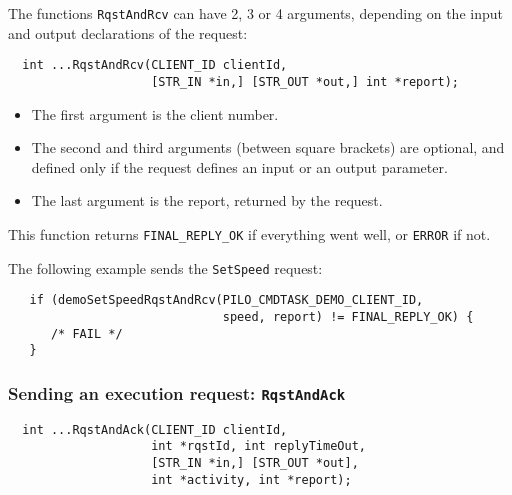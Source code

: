 The functions \texttt{RqstAndRcv} can have 2, 3 or 4 arguments, depending on
the input and output declarations of the request:

\begin{center}\begin{cartouche}\small\begin{verbatim}
  int ...RqstAndRcv(CLIENT_ID clientId,
                    [STR_IN *in,] [STR_OUT *out,] int *report);
\end{verbatim}\end{cartouche}\end{center}

\begin{itemize}
\item The first argument is the client number. 

\item The second and third arguments (between square brackets) are
optional, and defined only if the request defines an input or an output
parameter.

\item The last argument is the report, returned by the request.
\end{itemize}

This function returns \texttt{FINAL\_REPLY\_OK}  if everything went well, or
\texttt{ERROR} if not.

\bigbreak

The following example sends the \texttt{SetSpeed} request:

\begin{center}\begin{cartouche}\small\begin{verbatim}
   if (demoSetSpeedRqstAndRcv(PILO_CMDTASK_DEMO_CLIENT_ID, 
                              speed, report) != FINAL_REPLY_OK) {
      /* FAIL */
   }
\end{verbatim}\end{cartouche}\end{center}


\subsubsection{Sending an execution request: \texttt{RqstAndAck}}

\begin{center}\begin{cartouche}\small\begin{verbatim}
  int ...RqstAndAck(CLIENT_ID clientId,
                    int *rqstId, int replyTimeOut,
                    [STR_IN *in,] [STR_OUT *out],
                    int *activity, int *report);
\end{verbatim}\end{cartouche}\end{center}

